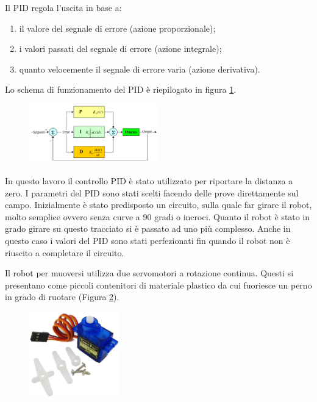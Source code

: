 \documentclass[twoside,twocolumn]{article}
\begin{document}
Il PID regola l'uscita in base a:
\begin{enumerate}
	\item il valore del segnale di errore (azione proporzionale);
	\item i valori passati del segnale di errore (azione integrale);
	\item quanto velocemente il segnale di errore varia (azione derivativa).
\end{enumerate}

Lo schema di funzionamento del PID è riepilogato  in figura \ref{fig:pid}.

\begin{figure}[h]
	\centering
	\includegraphics[width=0.5\textwidth]{immagini/PID}
	\caption{}
	\label{fig:pid}
\end{figure}

In questo lavoro il controllo PID è stato utilizzato per riportare la distanza a zero. I parametri del PID sono stati scelti facendo delle prove direttamente sul campo. Inizialmente è stato predisposto un circuito, sulla quale far girare il robot, molto semplice ovvero senza curve a 90 gradi o incroci. Quanto il robot è stato in grado girare su questo tracciato si è passato ad uno più complesso. Anche in questo caso i valori del PID sono stati perfezionati fin quando il robot non è riuscito a completare il circuito.

Il robot per muoversi utilizza due servomotori a rotazione continua. Questi si presentano come piccoli contenitori di materiale plastico da cui fuoriesce un perno in grado di ruotare (Figura \ref{fig:servo}). 

\begin{figure}[h]
	\centering
	\includegraphics[width=0.35\textwidth]{immagini/servo}
	\caption{}
	\label{fig:servo}
\end{figure}
\end{document}
